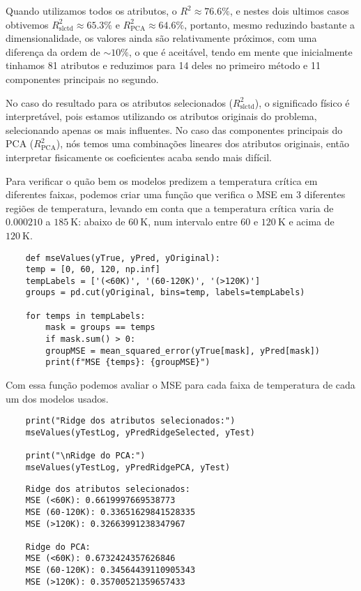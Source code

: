 Quando utilizamos todos os atributos, o $R^{2} \approx 76.6\%$, e nestes dois ultimos casos obtivemos $R^{2}_{\text{slctd}} \approx 65.3\%$ e $R^{2}_{\text{PCA}} \approx 64.6\%$, portanto, mesmo reduzindo bastante a dimensionalidade, os valores ainda são relativamente próximos, com uma diferença da ordem de $\sim 10\%$, o que é aceitável, tendo em mente que inicialmente tinhamos 81 atributos e reduzimos para 14 deles no primeiro método e 11 componentes principais no segundo.

No caso do resultado para os atributos selecionados ($R^{2}_{\text{slctd}}$), o significado físico é interpretável, pois estamos utilizando os atributos originais do problema, selecionando apenas os mais influentes. No caso das componentes principais do PCA ($R^{2}_{\text{PCA}}$), nós temos uma combinações lineares dos atributos originais, então interpretar fisicamente os coeficientes acaba sendo mais difícil.

Para verificar o quão bem os modelos predizem a temperatura crítica em diferentes faixas, podemos criar uma função que verifica o MSE em 3 diferentes regiões de temperatura, levando em conta que a temperatura crítica varia de $0.000210$ a $185~\text{K}$: abaixo de $60~\text{K}$, num intervalo entre $60$ e $120~\text{K}$ e acima de $120~\text{K}$.
\begin{longlisting}
    \begin{verbatim}
    def mseValues(yTrue, yPred, yOriginal):
    temp = [0, 60, 120, np.inf]
    tempLabels = ['(<60K)', '(60-120K)', '(>120K)']
    groups = pd.cut(yOriginal, bins=temp, labels=tempLabels)

    for temps in tempLabels:
        mask = groups == temps
        if mask.sum() > 0:
        groupMSE = mean_squared_error(yTrue[mask], yPred[mask])
        print(f"MSE {temps}: {groupMSE}")
    \end{verbatim}
\end{longlisting}

Com essa função podemos avaliar o MSE para cada faixa de temperatura de cada um dos modelos usados.
\begin{longlisting}
    \begin{verbatim}
    print("Ridge dos atributos selecionados:")
    mseValues(yTestLog, yPredRidgeSelected, yTest)

    print("\nRidge do PCA:")
    mseValues(yTestLog, yPredRidgePCA, yTest)
    \end{verbatim}
\end{longlisting}
\begin{verbatim}
    Ridge dos atributos selecionados:
    MSE (<60K): 0.6619997669538773
    MSE (60-120K): 0.33651629841528335
    MSE (>120K): 0.32663991238347967

    Ridge do PCA:
    MSE (<60K): 0.6732424357626846
    MSE (60-120K): 0.34564439110905343
    MSE (>120K): 0.35700521359657433
\end{verbatim}


